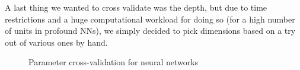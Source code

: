 \documentclass{article} %
\begin{document}
A last thing we wanted to cross validate was the depth, but due to time restrictions and a huge computational workload for doing so (for a high number of units in profound NNs), we simply decided to pick dimensions based on a try out of various ones by hand.
\begin{figure}
\centering     %
{}
\caption{Parameter cross-validation for neural networks}
\end{figure}
\end{document}
